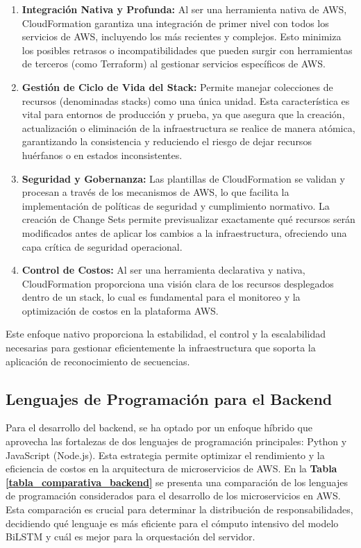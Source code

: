 \begin{enumerate}[label=\arabic*., nosep, itemsep=0pt]
    \item \textbf{Integración Nativa y Profunda:} Al ser una herramienta nativa de AWS, CloudFormation garantiza una integración de primer nivel con todos los servicios de AWS, incluyendo los más recientes y complejos. Esto minimiza los posibles retrasos o incompatibilidades que pueden surgir con herramientas de terceros (como Terraform) al gestionar servicios específicos de AWS.
    \item \textbf{Gestión de Ciclo de Vida del Stack:} Permite manejar colecciones de recursos (denominadas stacks) como una única unidad. Esta característica es vital para entornos de producción y prueba, ya que asegura que la creación, actualización o eliminación de la infraestructura se realice de manera atómica, garantizando la consistencia y reduciendo el riesgo de dejar recursos huérfanos o en estados inconsistentes.
    \item \textbf{Seguridad y Gobernanza:} Las plantillas de CloudFormation se validan y procesan a través de los mecanismos de AWS, lo que facilita la implementación de políticas de seguridad y cumplimiento normativo. La creación de Change Sets permite previsualizar exactamente qué recursos serán modificados antes de aplicar los cambios a la infraestructura, ofreciendo una capa crítica de seguridad operacional.
    \item \textbf{Control de Costos:} Al ser una herramienta declarativa y nativa, CloudFormation proporciona una visión clara de los recursos desplegados dentro de un stack, lo cual es fundamental para el monitoreo y la optimización de costos en la plataforma AWS.
\end{enumerate}

Este enfoque nativo proporciona la estabilidad, el control y la escalabilidad necesarias para gestionar eficientemente la infraestructura que soporta la aplicación de reconocimiento de secuencias.

\clearpage

\subsection{Lenguajes de Programación para el Backend}

Para el desarrollo del backend, se ha optado por un enfoque híbrido que aprovecha las fortalezas de dos lenguajes de programación principales: Python y JavaScript (Node.js). Esta estrategia permite optimizar el rendimiento y la eficiencia de costos en la arquitectura de microservicios de AWS. En la \textbf{Tabla \ref{tabla_comparativa_backend}} se presenta una comparación de los lenguajes de programación considerados para el desarrollo de los microservicios en AWS. Esta comparación es crucial para determinar la distribución de responsabilidades, decidiendo qué lenguaje es más eficiente para el cómputo intensivo del modelo BiLSTM y cuál es mejor para la orquestación del servidor.

